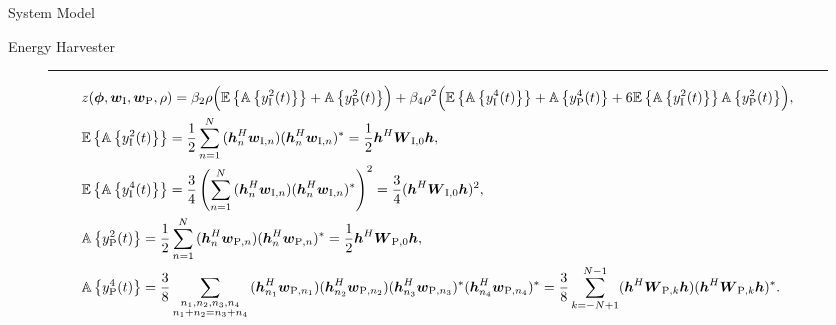 \documentclass[journal]{IEEEtran}
\begin{document}
\begin{section}{System Model}
\begin{subsection}{Energy Harvester}
			\begin{figure}[!b]
				\hrule
				\begin{align}
					&z(\boldsymbol{\phi},\boldsymbol{w}_{\mathrm{I}},\boldsymbol{w}_{\mathrm{P}},\rho) = \beta_2\rho\Bigl(\mathbb{E}\left\{\mathbb{A}\left\{y_{\mathrm{I}}^2(t)\right\}\right\}+\mathbb{A}\left\{y_{\mathrm{P}}^2(t)\right\}\Bigr)+\beta_4\rho^2\Bigl(\mathbb{E}\left\{\mathbb{A}\left\{y_{\mathrm{I}}^4(t)\right\}\right\}+\mathbb{A}\left\{y_{\mathrm{P}}^4(t)\right\}+6\mathbb{E}\left\{\mathbb{A}\left\{y_{\mathrm{I}}^2(t)\right\}\right\}\mathbb{A}\left\{y_{\mathrm{P}}^2(t)\right\}\Bigr),\label{eq:z_expand}\\
					&\mathbb{E}\left\{\mathbb{A}\left\{y_{\mathrm{I}}^2(t)\right\}\right\} = \frac{1}{2}\sum_{n=1}^N{(\boldsymbol{h}_{n}^H\boldsymbol{w}_{\mathrm{I},n})(\boldsymbol{h}_{n}^H\boldsymbol{w}_{\mathrm{I},n})^*} = \frac{1}{2}\boldsymbol{h}^H\boldsymbol{W}_{\mathrm{I},0}\boldsymbol{h},\label{eq:y_I2}\\
					&\mathbb{E}\left\{\mathbb{A}\left\{y_{\mathrm{I}}^4(t)\right\}\right\} = \frac{3}{4}\left(\sum_{n=1}^N{(\boldsymbol{h}_{n}^H\boldsymbol{w}_{\mathrm{I},n})(\boldsymbol{h}_{n}^H\boldsymbol{w}_{\mathrm{I},n})^*}\right)^2 = \frac{3}{4}(\boldsymbol{h}^H\boldsymbol{W}_{\mathrm{I},0}\boldsymbol{h})^2,\label{eq:y_I4}\\
					&\mathbb{A}\left\{y_{\mathrm{P}}^2(t)\right\} = \frac{1}{2}\sum_{n=1}^N{(\boldsymbol{h}_{n}^H\boldsymbol{w}_{\mathrm{P},n})(\boldsymbol{h}_{n}^H\boldsymbol{w}_{\mathrm{P},n})^*} = \frac{1}{2}\boldsymbol{h}^H\boldsymbol{W}_{\mathrm{P},0}\boldsymbol{h},\label{eq:y_P2}\\
					&\mathbb{A}\left\{y_{\mathrm{P}}^4(t)\right\} = \frac{3}{8}\sum_{\substack{{n_1},{n_2},{n_3},{n_4}\\{n_1}+{n_2}={n_3}+{n_4}}}{(\boldsymbol{h}_{{n_1}}^H\boldsymbol{w}_{\mathrm{P},{n_1}})(\boldsymbol{h}_{{n_2}}^H\boldsymbol{w}_{\mathrm{P},{n_2}})(\boldsymbol{h}_{{n_3}}^H\boldsymbol{w}_{\mathrm{P},{n_3}})^*(\boldsymbol{h}_{{n_4}}^H\boldsymbol{w}_{\mathrm{P},{n_4}})^*} = \frac{3}{8}\sum_{k=-N+1}^{N-1}(\boldsymbol{h}^H\boldsymbol{W}_{\mathrm{P},k}\boldsymbol{h})(\boldsymbol{h}^H\boldsymbol{W}_{\mathrm{P},k}\boldsymbol{h})^*.\label{eq:y_P4}
				\end{align}
			\end{figure}
		\end{subsection}



\end{section}
\end{document}
